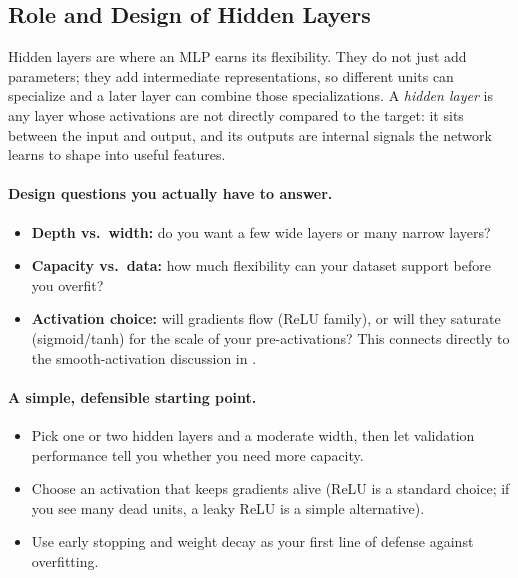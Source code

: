 \subsection{Role and Design of Hidden Layers}
\label{sec:backprop_role_and_design_of_hidden_layers}

Hidden layers are where an MLP earns its flexibility. They do not just add parameters; they add intermediate representations, so different units can specialize and a later layer can combine those specializations.
A \emph{hidden layer} is any layer whose activations are not directly compared to the target: it sits between the input and output, and its outputs are internal signals the network learns to shape into useful features.

\paragraph{Design questions you actually have to answer.}
\begin{itemize}
    \item \textbf{Depth vs.\ width:} do you want a few wide layers or many narrow layers?
    \item \textbf{Capacity vs.\ data:} how much flexibility can your dataset support before you overfit?
    \item \textbf{Activation choice:} will gradients flow (ReLU family), or will they saturate (sigmoid/tanh) for the scale of your pre\hyp{}activations? This connects directly to the smooth-activation discussion in .
\end{itemize}

\paragraph{A simple, defensible starting point.}
\begin{itemize}
    \item Pick one or two hidden layers and a moderate width, then let validation performance tell you whether you need more capacity.
    \item Choose an activation that keeps gradients alive (ReLU is a standard choice; if you see many dead units, a leaky ReLU is a simple alternative).
    \item Use early stopping and weight decay as your first line of defense against overfitting.
\end{itemize}

